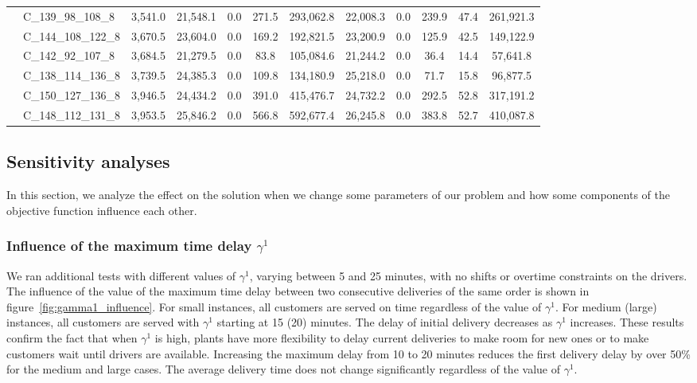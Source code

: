 \documentclass{article}
\begin{document}
\begin{table}[!ht]
{\begin{tabular}{llcccccccccc}
     & C_139_98_108_8 & 3,541.0 & 21,548.1 & 0.0 & 271.5 & 293,062.8 & 22,008.3 & 0.0 & 239.9 & 47.4 & 261,921.3 \\
     & C_144_108_122_8 & 3,670.5 & 23,604.0 & 0.0 & 169.2 & 192,821.5 & 23,200.9 & 0.0 & 125.9 & 42.5 & 149,122.9 \\
     & C_142_92_107_8 & 3,684.5 & 21,279.5 & 0.0 & 83.8 & 105,084.6 & 21,244.2 & 0.0 & 36.4 & 14.4 & 57,641.8 \\
     & C_138_114_136_8 & 3,739.5 & 24,385.3 & 0.0 & 109.8 & 134,180.9 & 25,218.0 & 0.0 & 71.7 & 15.8 & 96,877.5 \\
     & C_150_127_136_8 & 3,946.5 & 24,434.2 & 0.0 & 391.0 & 415,476.7 & 24,732.2 & 0.0 & 292.5 & 52.8 & 317,191.2 \\
     & C_148_112_131_8 & 3,953.5 & 25,846.2 & 0.0 & 566.8 & 592,677.4 & 26,245.8 & 0.0 & 383.8 & 52.7 & 410,087.8 \\
    \bottomrule
    \end{tabular}
    }
\end{table}
    
\subsection{Sensitivity analyses}

In this section, we analyze the effect on the solution when we change some parameters of our problem and how some components of the objective function influence each other.

\subsubsection{Influence of the maximum time delay $\gamma^1$}

We ran additional tests with different values of $\gamma^1$, varying between 5 and 25 minutes, with no shifts or overtime constraints on the drivers. The influence of the value of the maximum time delay between two consecutive deliveries of the same order is shown in figure~\ref*{fig:gamma1_influence}. For small instances, all customers are served on time regardless of the value of $\gamma^1$. For medium (large) instances, all customers are served with $\gamma^1$ starting at 15 (20) minutes. The delay of initial delivery decreases as $\gamma^1$ increases. These results confirm the fact that when $\gamma^1$ is high, plants have more flexibility to delay current deliveries to make room for new ones or to make customers wait until drivers are available. Increasing the maximum delay from 10 to 20 minutes reduces the first delivery delay by over 50\% for the medium and large cases. The average delivery time does not change significantly regardless of the value of $\gamma^1$.
\end{document}
